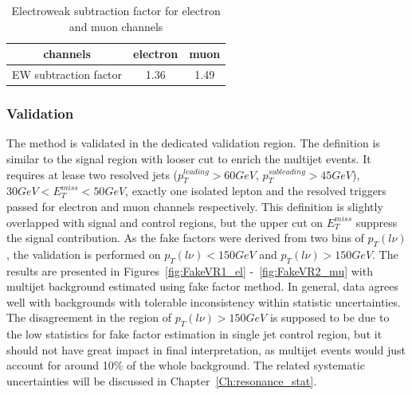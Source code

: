 \begin{table}[h]
  \caption{Electroweak subtraction factor for electron and muon channels} \label{tab:ewsubtraction}
  \begin{center}

    \begin{tabular}{ | c | c | c | }
     \hline
     channels                       &   electron   & muon \\ \hline
     EW subtraction factor          &   1.36       & 1.49 \\ \hline
\end{tabular}
\end{center}
\end{table}

\subsubsection*{Validation}
The method is validated in the dedicated validation region. The definition is similar to the signal region with looser cut to enrich the multijet events. It requires at lease two resolved jets ($p_{T}^{leading}>60GeV$, $p_{T}^{subleading}>45GeV$), $30GeV<E^{miss}_{T}<50GeV$, exactly one isolated lepton and the resolved triggers passed for electron and muon channels respectively. This definition is slightly overlapped with signal and control regions, but the upper cut on $E^{miss}_{T}$ suppress the signal contribution.  As the fake factors were derived from two bins of $p_{T}(l\nu)$, the validation is performed on $p_{T}(l\nu)<150 GeV$ and $p_{T}(l\nu)>150 GeV$. The results are presented in Figures~\ref{fig:FakeVR1_el} -~\ref{fig:FakeVR2_mu} with multijet background estimated using fake factor method. In general, data agrees well with backgrounds with tolerable inconsistency within statistic uncertainties. The disagreement in the region of $p_{T}(l\nu)>150 GeV$ is supposed to be due to the low statistics for fake factor estimation in single jet control region, but it should not have great impact in final interpretation, as multijet events would just account for around 10\% of the whole background. The related systematic uncertainties will be discussed in Chapter~\ref{Ch:resonance_stat}.
\clearpage
